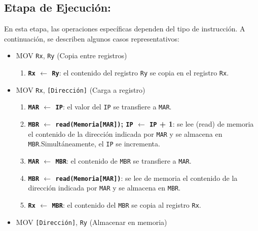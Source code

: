 \documentclass[12pt,oneside]{templates/unerthesis}
\providecommand{\tightlist}{%
  \setlength{\itemsep}{0pt}\setlength{\parskip}{0pt}}
\begin{document}
\hypertarget{etapa-de-ejecuciuxf3n}{%
\subsection{Etapa de Ejecución:}\label{etapa-de-ejecuciuxf3n}}

En esta etapa, las operaciones específicas dependen del tipo de instrucción. A continuación, se describen algunos casos representativos:

\begin{itemize}
\tightlist
\item
  MOV \texttt{Rx}, \texttt{Ry} (Copia entre registros)

  \begin{enumerate}
  \def\labelenumi{\arabic{enumi}.}
  \tightlist
  \item
    \textbf{\texttt{Rx} \(\leftarrow\) \texttt{Ry}}:
    el contenido del registro \texttt{Ry} se copia en el registro \texttt{Rx}.
  \end{enumerate}
\item
  MOV \texttt{Rx}, \texttt{{[}Dirección{]}} (Carga a registro)

  \begin{enumerate}
  \def\labelenumi{\arabic{enumi}.}
  \tightlist
  \item
    \textbf{\texttt{MAR} \(\leftarrow\) \texttt{IP}}:
    el valor del \texttt{IP} se transfiere a \texttt{MAR}.
  \item
    \textbf{\texttt{MBR} \(\leftarrow\) \texttt{read(Memoria{[}MAR{]})}; \texttt{IP} \(\leftarrow\) \texttt{IP} + 1}:
    se lee (read) de memoria el contenido de la dirección indicada por \texttt{MAR} y se almacena en \texttt{MBR}.Simultáneamente, el \texttt{IP} se incrementa.
  \item
    \textbf{\texttt{MAR} \(\leftarrow\) \texttt{MBR}}:
    el contenido de \texttt{MBR} se transfiere a \texttt{MAR}.
  \item
    \textbf{\texttt{MBR} \(\leftarrow\) \texttt{read(Memoria{[}MAR{]})}}:
    se lee de memoria el contenido de la dirección indicada por \texttt{MAR} y se almacena en \texttt{MBR}.
  \item
    \textbf{\texttt{Rx} \(\leftarrow\) \texttt{MBR}}:
    el contenido del \texttt{MBR} se copia al registro \texttt{Rx}.
  \end{enumerate}
\item
  MOV \texttt{{[}Dirección{]}}, \texttt{Ry} (Almacenar en memoria)


\end{itemize}
\end{document}

